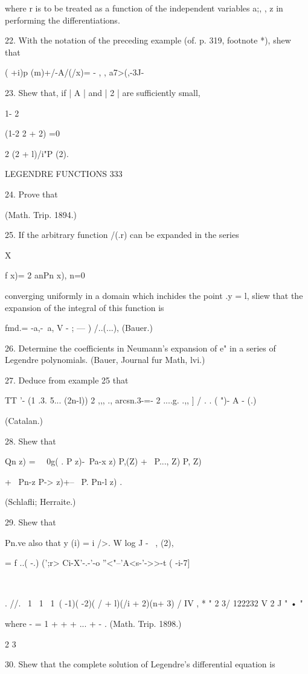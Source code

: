 {{{{where r is to be treated as a function of the independent variables
a;, , z in performing the differentiations.

22. With the notation of the preceding example (of. p. 319, footnote
*), shew that

( +i)p (m)+/-A/(/x)= - , , a7>(,-3J-

23. Shew that, if | A | and | 2 | are sufficiently small,

1- 2

(1-2 2 + 2) =0

2 (2 + l)/i"P (2).

LEGENDRE FUNCTIONS 333

24. Prove that

(Math. Trip. 1894.)

25. If the arbitrary function /(.r) can be expanded in the series

X

f x)= 2 anPn x), n=0

converging uniformly in a domain which inchides the point .y = l,
sliew that the expansion of the integral of this function is

fmd.= -a,-\ a, V - ; --- ) /..(...), (Bauer.)

26. Determine the coefficients in Neumann's expansion of e" in a
series of Legendre polynomials. (Bauer, Journal fur Math, lvi.)

27. Deduce from example 25 that

TT '- (1 .3. 5... (2n-l)) 2 ,,, ., arcsn.3-=- 2 ....g. .,, ] / . . (
")- A - (.)

(Catalan.)

28. Shew that

Qn z) = \ \ 0g( . P z)-\ Pa-x z) P,(Z) + \ P..., Z) P, Z)

+ \ Pn-z P-> z)+-- \ P. Pn-l z) .

(Schlafli; Herraite.)

29. Shew that

Pn.ve also that y (i) = i />. W log J - \ , (2),

= f ..( -.) (';r> Ci-X'-.-'-o ''<"--'A<s-'->>-t ( -i-7]

\

. //. \ 1 \ 1 \ 1\ ( -1)( -2)( / + l)(/i + 2)(n+ 3) / IV , * " 2 3/
122232 V 2 J " • "

where - = 1 + + + ... + - . (Math. Trip. 1898.)

2 3

30. Shew that the complete solution of Legendre's differential
equation is

}}}}
